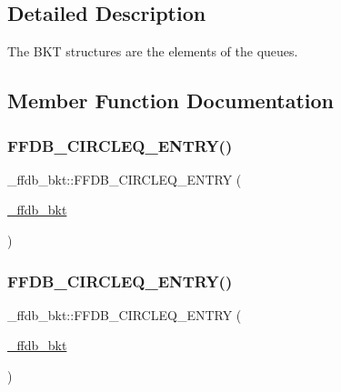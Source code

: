 \subsection{Detailed Description}
The B\+KT structures are the elements of the queues. 

\subsection{Member Function Documentation}
\mbox{\label{struct__ffdb__bkt_a0ca6bc2cc68e6384b4b475c41a07fcea}} 
\subsubsection{\texorpdfstring{FFDB\_CIRCLEQ\_ENTRY()}{FFDB\_CIRCLEQ\_ENTRY()}\hspace{0.1cm}{\footnotesize\ttfamily [1/2]}}
{\footnotesize\ttfamily \+\_\+ffdb\+\_\+bkt\+::\+F\+F\+D\+B\+\_\+\+C\+I\+R\+C\+L\+E\+Q\+\_\+\+E\+N\+T\+RY (\begin{DoxyParamCaption}\item[{\mbox{\hyperlink{struct__ffdb__bkt}{\+\_\+ffdb\+\_\+bkt}}}]{ }\end{DoxyParamCaption})}

\mbox{\label{struct__ffdb__bkt_ac7e62eb857dfeaaf80b72492d3be3584}} 
\subsubsection{\texorpdfstring{FFDB\_CIRCLEQ\_ENTRY()}{FFDB\_CIRCLEQ\_ENTRY()}\hspace{0.1cm}{\footnotesize\ttfamily [2/2]}}
{\footnotesize\ttfamily \+\_\+ffdb\+\_\+bkt\+::\+F\+F\+D\+B\+\_\+\+C\+I\+R\+C\+L\+E\+Q\+\_\+\+E\+N\+T\+RY (\begin{DoxyParamCaption}\item[{\mbox{\hyperlink{struct__ffdb__bkt}{\+\_\+ffdb\+\_\+bkt}}}]{ }\end{DoxyParamCaption})}

\mbox{\label{struct__ffdb__bkt_af1ee791a45e4526e55dc86d09fb29769}} 
